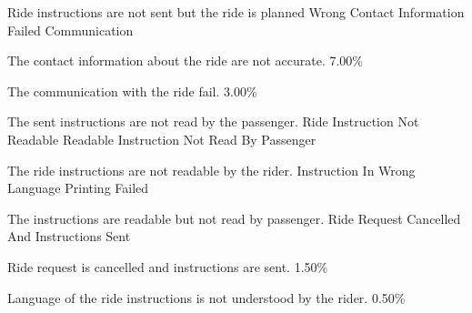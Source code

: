     {}
    
  \startkaosspec
  	 {Ride instructions are not sent but the ride is planned}
  	 {Wrong Contact Information}
  	 {Failed Communication}
  \stopkaosspec
  
  \startkaosspec
  	 {The contact information about the ride are not accurate.}
  	 {7.00\%}
  \stopkaosspec
  
  \startkaosspec
  	 {The communication with the ride fail.}
  	 {3.00\%}
  \stopkaosspec
  
    

    {}
  
  \startkaosspec
  	 {The sent instructions are not read by the passenger.}
  	 {Ride Instruction Not Readable}
  	 {Readable Instruction Not Read By Passenger}
  \stopkaosspec
  
  \startkaosspec
  	 {The ride instructions are not readable by the rider.}
  	 {Instruction In Wrong Language}
  	 {Printing Failed}
  \stopkaosspec
  
  \startkaosspec
  	 {The instructions are readable but not read by passenger.}
  	 {Ride Request Cancelled And Instructions Sent}
  \stopkaosspec
  
  \startkaosspec
  	 {Ride request is cancelled and instructions are sent.}
  	 {1.50\%}
  \stopkaosspec
  
  \startkaosspec
  	 {Language of the ride instructions is not understood by the rider.}
  	 {0.50\%}
  \stopkaosspec
  
